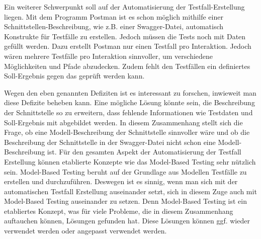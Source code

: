 \documentclass{llncs}
\begin{document}
Ein weiterer Schwerpunkt soll auf der Automatisierung der Testfall-Erstellung liegen. Mit dem Programm Postman ist es schon möglich mithilfe einer Schnittstellen-Beschreibung, wie z.B. einer Swagger-Datei, automatisch Konstrukte für Testfälle zu erstellen. Jedoch müssen die Tests noch mit Daten gefüllt werden. Dazu erstellt Postman nur einen Testfall pro Interaktion. Jedoch wären mehrere Testfälle pro Interaktion sinnvoller, um verschiedene Möglichkeiten und Pfade abzudecken. Zudem fehlt den Testfällen ein definiertes Soll-Ergebnis gegen das geprüft werden kann. 

Wegen den eben genannten Defiziten ist es interessant zu forschen, inwieweit man diese Defizite beheben kann. Eine mögliche Lösung könnte sein, die Beschreibung der Schnittstelle so zu erweitern, dass fehlende Informationen wie Testdaten und Soll-Ergebnis mit abgebildet werden. In diesem Zusammenhang stellt sich die Frage, ob eine Modell-Beschreibung der Schnittstelle sinnvoller wäre und ob die Beschreibung der Schnittstelle in der Swagger-Datei nicht schon eine Modell-Beschreibung ist. Für den gesamten Aspekt der Automatisierung der Testfall Erstellung können etablierte Konzepte wie das Model-Based Testing sehr nützlich sein. Model-Based Testing beruht auf der Grundlage aus Modellen Testfälle zu erstellen und durchzuführen. Deswegen ist es sinnig, wenn man sich mit der automatischen Testfall Erstellung auseinander setzt, sich in diesem Zuge auch mit Model-Based Testing auseinander zu setzen. Denn Model-Based Testing ist ein etabliertes Konzept, was für viele Probleme, die in diesem Zusammenhang auftauchen können, Lösungen gefunden hat. Diese Lösungen können ggf. wieder verwendet werden oder angepasst verwendet werden. 



\end{document}
